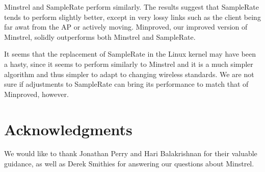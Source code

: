 \documentclass[twocolumn,10pt]{article}
\begin{document}
Minstrel and SampleRate perform similarly.  The results suggest that
SampleRate tends to perform slightly better, except in very lossy
links such as the client being far awat from the AP or actively
moving.  Minproved, our improved version of Minstrel, solidly
outperforms both Minstrel and SampleRate.

It seems that the replacement of SampleRate in the Linux kernel may
have been a hasty, since it seems to perform similarly to Minstrel and
it is a much simpler algorithm and thus simpler to adapt to changing
wireless standards.  We are not sure if adjustments to SampleRate can
bring its performance to match that of Minproved, however.

\section{Acknowledgments}

We would like to thank Jonathan Perry and Hari Balakrishnan for their
valuable guidance, as well as Derek Smithies for answering our
questions about Minstrel.



\end{document}
